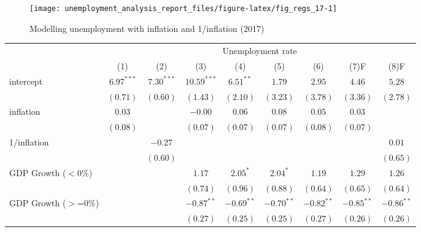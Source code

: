 \documentclass[
]{article}
\begin{document}
\begin{figure}

{\centering \texttt{[image: unemployment\_analysis\_report\_files/figure-latex/fig\_regs\_17-1]} 

}

\caption{Modelling unemployment with inflation and 1/inflation (2017)}\label{fig:fig_regs_17}
\end{figure}

\begin{tabular}{l c c c c c c c c}
\hline
 & \multicolumn{8}{c}{Unemployment rate} \\
\cline{2-9}
 & (1) & (2) & (3) & (4) & (5) & (6) & (7)F & (8)F \\
\hline
intercept              & $6.97^{***}$ & $7.30^{***}$ & $10.59^{***}$ & $6.51^{**}$  & $1.79$       & $2.95$       & $4.46$       & $5.28$       \\
                       & $(0.71)$     & $(0.60)$     & $(1.43)$      & $(2.10)$     & $(3.23)$     & $(3.78)$     & $(3.36)$     & $(2.78)$     \\
inflation              & $0.03$       &              & $-0.00$       & $0.06$       & $0.08$       & $0.05$       & $0.03$       &              \\
                       & $(0.08)$     &              & $(0.07)$      & $(0.07)$     & $(0.07)$     & $(0.08)$     & $(0.07)$     &              \\
1/inflation            &              & $-0.27$      &               &              &              &              &              & $0.01$       \\
                       &              & $(0.60)$     &               &              &              &              &              & $(0.65)$     \\
GDP Growth ($<$0\%)    &              &              & $1.17$        & $2.05^{*}$   & $2.04^{*}$   & $1.19$       & $1.29$       & $1.26$       \\
                       &              &              & $(0.74)$      & $(0.96)$     & $(0.88)$     & $(0.64)$     & $(0.65)$     & $(0.64)$     \\
GDP Growth ($>$=0\%)   &              &              & $-0.87^{**}$  & $-0.69^{**}$ & $-0.70^{**}$ & $-0.82^{**}$ & $-0.85^{**}$ & $-0.86^{**}$ \\
                       &              &              & $(0.27)$      & $(0.25)$     & $(0.25)$     & $(0.27)$     & $(0.26)$     & $(0.26)$     \\

\end{tabular}
\end{document}
